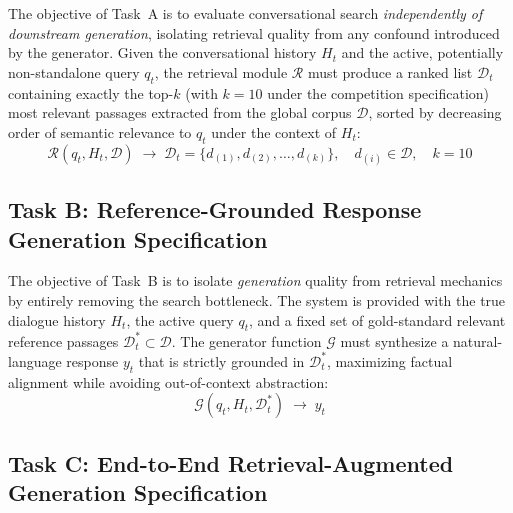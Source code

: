 The objective of Task~A is to evaluate conversational search \textit{independently of downstream generation}, isolating retrieval quality from any confound introduced by the generator. Given the conversational history $H_t$ and the active, potentially non-standalone query $q_t$, the retrieval module $\mathcal{R}$ must produce a ranked list $\mathcal{D}_t$ containing exactly the top-$k$ (with $k{=}10$ under the competition specification) most relevant passages extracted from the global corpus $\mathcal{D}$, sorted by decreasing order of semantic relevance to $q_t$ under the context of $H_t$:
\begin{equation}
\mathcal{R}(q_t, H_t, \mathcal{D}) \;\longrightarrow\; \mathcal{D}_t = \big\{d_{(1)}, d_{(2)}, \dots, d_{(k)}\big\}, \quad d_{(i)} \in \mathcal{D}, \quad k=10
\end{equation}

\subsection{Task B: Reference-Grounded Response Generation Specification}

The objective of Task~B is to isolate \textit{generation} quality from retrieval mechanics by entirely removing the search bottleneck. The system is provided with the true dialogue history $H_t$, the active query $q_t$, and a fixed set of gold-standard relevant reference passages $\mathcal{D}_t^* \subset \mathcal{D}$. The generator function $\mathcal{G}$ must synthesize a natural-language response $y_t$ that is strictly grounded in $\mathcal{D}_t^*$, maximizing factual alignment while avoiding out-of-context abstraction:
\begin{equation}
\mathcal{G}(q_t, H_t, \mathcal{D}_t^*) \;\longrightarrow\; y_t
\end{equation}

\subsection{Task C: End-to-End Retrieval-Augmented Generation Specification}

